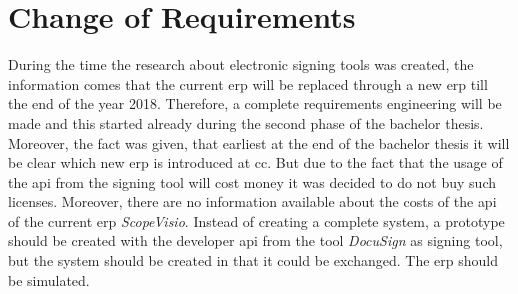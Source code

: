 \section{Change of Requirements}
During the time the research about electronic signing tools was created, the information comes that the current \gls{erp} will be replaced through a new \gls{erp} till the end of the year 2018. Therefore, a complete requirements engineering will be made and this started already during the second phase of the bachelor thesis. Moreover, the fact was given, that earliest at the end of the bachelor thesis it will be clear which new \gls{erp} is introduced at \gls{cc}. But due to the fact that the usage of the \gls{api} from the signing tool will cost money it was decided to do not buy such licenses. Moreover, there are no information available about the costs of the \gls{api} of the current \gls{erp} \textit{ScopeVisio}. Instead of creating a complete system, a prototype should be created with the developer \gls{api} from the tool \textit{DocuSign} as signing tool, but the system should be created in that it could be exchanged. The \gls{erp} should be simulated.